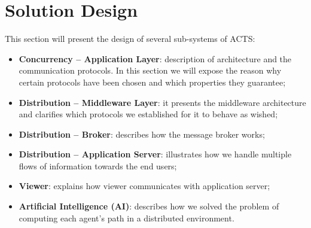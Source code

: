 \section{Solution Design}\label{sec:sol-design}

This section will present the design of several sub-systems of ACTS:

\begin{itemize}
\item \textbf{Concurrency -- Application Layer}:
  description of architecture and the communication protocols.
  In this section we
  will expose the reason why certain protocols have been chosen and which
  properties they guarantee;
\item \textbf{Distribution -- Middleware Layer}:
  it presents the middleware architecture and clarifies which protocols
  we established for it to behave as wished;
\item \textbf{Distribution -- Broker}:
  describes how the message broker works;
\item \textbf{Distribution -- Application Server}:
  illustrates how we handle multiple flows of information towards the end
  users;
\item \textbf{Viewer}:
  explains how viewer communicates with application server;
\item \textbf{Artificial Intelligence (AI)}:
  describes how we solved the problem of computing each agent's path
  in a distributed environment.
\end{itemize}







